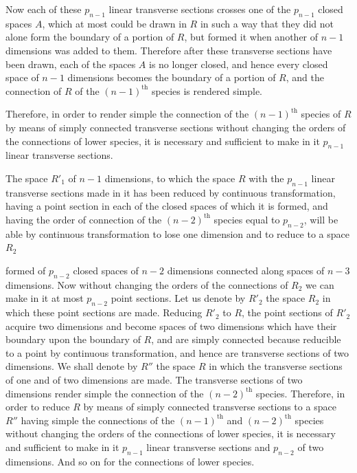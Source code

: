 \documentclass{article}
\begin{document}
Now each of these $p_{n-1}$ linear transverse sections crosses one of the $p_{n-1}$ closed spaces $A$, which at most could be drawn in $R$ in such a way that they did not alone form the boundary of a portion of $R$, but formed it when another of $n-1$ dimensions was added to them. Therefore after these transverse sections have been drawn, each of the spaces $A$ is no longer closed, and hence every closed space of $n-1$ dimensions becomes the boundary of a portion of $R$, and the connection of $R$ of the $(n-1)^{\text{th}}$ species is rendered simple.

Therefore, in order to render simple the connection of the $(n-1)^{\text{th}}$ species of $R$ by means of simply connected transverse sections without changing the orders of the connections of lower species, it is necessary and sufficient to make in it $p_{n-1}$ linear transverse sections.

The space $R'_{1}$ of $n-1$ dimensions, to which the space $R$ with the $p_{n-1}$ linear transverse sections made in it has been reduced by continuous transformation, having a point section in each of the closed spaces of which it is formed, and having the order of connection of the $(n-2)^{\text{th}}$ species equal to $p_{n-2}$, will be able by continuous transformation to lose one dimension and to reduce to a space $R_{2}$

formed of $p_{n-2}$ closed spaces of $n-2$ dimensions connected along spaces of $n-3$ dimensions. Now without changing the orders of the connections of $R_{2}$ we can make in it at most $p_{n-2}$ point sections. Let us denote by $R'_{2}$ the space $R_{2}$ in which these point sections are made. Reducing $R'_{2}$ to $R$, the point sections of $R'_{2}$ acquire two dimensions and become spaces of two dimensions which have their boundary upon the boundary of $R$, and are simply connected because reducible to a point by continuous transformation, and hence are transverse sections of two dimensions. We shall denote by $R''$ the space $R$ in which the transverse sections of one and of two dimensions are made. The transverse sections of two dimensions render simple the connection of the $(n-2)^{\text{th}}$ species. Therefore, in order to reduce $R$ by means of simply connected transverse sections to a space $R''$ having simple the connections of the $(n-1)^{\text{th}}$ and $(n-2)^{\text{th}}$ species without changing the orders of the connections of lower species, it is necessary and sufficient to make in it $p_{n-1}$ linear transverse sections and $p_{n-2}$ of two dimensions. And so on for the connections of lower species.
\end{document}
